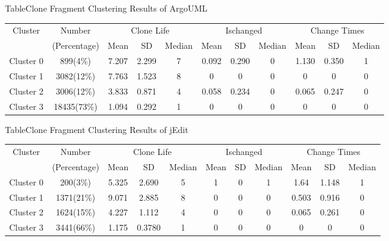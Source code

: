 \begin{table}[htbp]
{Table$\!$}{Clone Fragment Clustering Results of ArgoUML}
\vspace{0.5em}
\centering
\footnotesize
\begin{tabular}{ccccccccccc}
\toprule[1.5pt]
\multirow{2}{*}{Cluster}&{Number}&\multicolumn{3}{c}{Clone Life}&\multicolumn{3}{c}{Ischanged}&\multicolumn{3}{c}{Change Times} \\
&(Percentage)&{Mean}&SD &{Median}&{Mean}&SD &{Median}&{Mean}&SD &{Median}\\
\midrule[1pt]
Cluster 0&899(4\%)&7.207&2.299&7&0.092&0.290&0&1.130&0.350&1\\ 
Cluster 1&3082(12\%)&7.763&1.523&8&0&0&0	&0&0&0\\ 
Cluster 2&3006(12\%)&3.833&0.871&4&0.058&0.234&0	&0.065&0.247&0\\ 
Cluster 3&18435(73\%)&1.094&0.292&1	&0	&0	&0	&0	&0	&0\\ 
\bottomrule[1.5pt]
\end{tabular}
\end{table}

\begin{table}[htbp]
{Table$\!$}{Clone Fragment Clustering Results of jEdit}
\vspace{0.5em}
\centering
\footnotesize
\begin{tabular}{ccccccccccc}
\toprule[1.5pt]
\multirow{2}{*}{Cluster}&{Number}&\multicolumn{3}{c}{Clone Life}&\multicolumn{3}{c}{Ischanged}&\multicolumn{3}{c}{Change Times} \\
&(Percentage)&{Mean}&SD &{Median}&{Mean}&SD&{Median}&{Mean}&SD &{Median}\\
\midrule[1pt]
Cluster 0&200(3\%)&5.325&2.690&5&1	&0	&1	&1.64	&1.148&1\\ 
Cluster 1&1371(21\%)	&9.071&2.885&8	&0	&0	&0	&0.503&0.916&0\\ 
Cluster 2&	1624(15\%)	&4.227&1.112&4	&0	&0	&0	&0.065&0.261&0\\ 
Cluster 3&	3441(66\%)	&1.175	&0.3780&1	&0	&0	&0	&0	&0	&0\\ 
\bottomrule[1.5pt]
\end{tabular}
\end{table}


